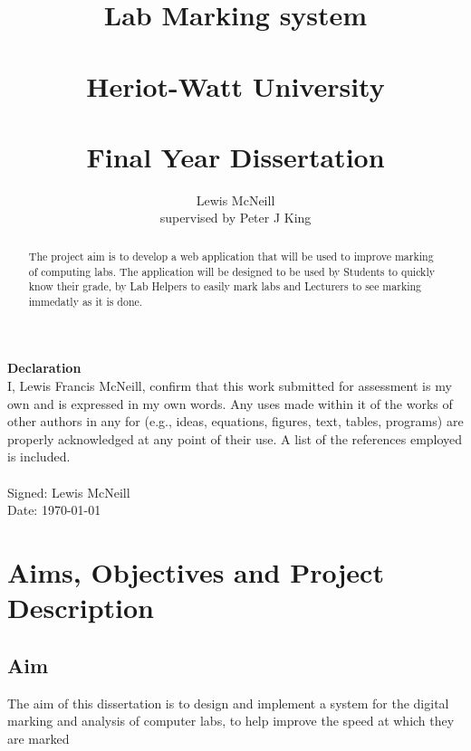 \documentclass[12pt]{article}  %
\title{Lab Marking system \\~\\  \large{Heriot-Watt University} \\~\\ Final Year Dissertation}
\author{Lewis McNeill\\
supervised by
Peter J King}
\theoremstyle{definition}
\theoremstyle{remark}
\begin{document}
\maketitle
{}
\newpage 

\doublespacing
\textbf{\Large{Declaration}} \\[2em]
I, Lewis Francis McNeill, confirm that this work submitted for assessment is my own and is expressed in my own words. Any uses made within it of the works of other authors in any for (e.g., ideas, equations, figures, text, tables, programs) are properly acknowledged at any point of their use. A list of the references employed is included.
\\
\\
Signed: Lewis McNeill
\\
Date: \today

\newpage                    
\begin{abstract}

The project aim is to develop a web application that will be used to improve marking of computing labs. The application will be designed to be used by Students to quickly know their grade, by Lab Helpers to easily mark labs and Lecturers to see marking immedatly as it is done.



\end{abstract}

\newpage                     

\singlespacing
\tableofcontents
\doublespacing



\newpage        

\section{Aims, Objectives and Project Description}
\setcounter{page}{1}

\subsection{Aim}
The aim of this dissertation is to design and implement a system for the digital marking and analysis of computer labs, to help improve the speed at which they are marked
\end{document}
